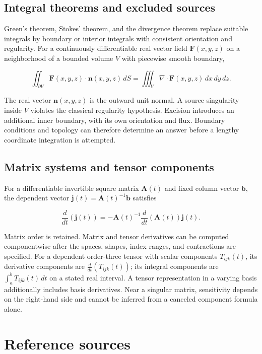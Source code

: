 \documentclass[11pt,oneside,openany]{book}
\begin{document}
\par\addvspace{8pt}\noindent\begin{minipage}{\linewidth}
\subsection{Integral theorems and excluded sources}

Green's theorem, Stokes' theorem, and the divergence theorem replace suitable
integrals by boundary or interior integrals with consistent orientation and
regularity. For a continuously differentiable real vector field \(\mathbf F(x,y,z)\)
on a neighborhood of a bounded volume \(V\) with piecewise smooth boundary,

\[
\iint_{\partial V}\mathbf F(x,y,z)\cdot\mathbf n(x,y,z)\,dS
=\iiint_V\nabla\cdot\mathbf F(x,y,z)\,dx\,dy\,dz.
\]

The real vector \(\mathbf n(x,y,z)\) is the outward unit normal. A source singularity
inside \(V\) violates the classical regularity hypothesis. Excision introduces an
additional inner boundary, with its own orientation and flux. Boundary
conditions and topology can therefore determine an answer before a lengthy
coordinate integration is attempted.

\end{minipage}\par
\par\addvspace{8pt}\noindent\begin{minipage}{\linewidth}
\subsection{Matrix systems and tensor components}

For a differentiable invertible square matrix \(\mathbf A(t)\) and fixed column
vector \(\mathbf b\), the dependent vector \(\mathbf j(t)=\mathbf A(t)^{-1}\mathbf b\)
satisfies

\[
\frac{d}{dt}\left(\mathbf j(t)\right)
=-\mathbf A(t)^{-1}\frac{d}{dt}\left(\mathbf A(t)\right)\mathbf j(t).
\]

Matrix order is retained. Matrix and tensor derivatives can be computed
componentwise after the spaces, shapes, index ranges, and contractions are
specified. For a dependent order-three tensor with scalar components
\(T_{ijk}(t)\), its derivative components are \(\frac{d}{dt}(T_{ijk}(t))\); its
integral components are \(\int_a^bT_{ijk}(t)\,dt\) on a stated real interval.
A tensor representation in a varying basis additionally includes basis derivatives.
Near a singular matrix, sensitivity depends on the right-hand side and cannot
be inferred from a canceled component formula alone.

\end{minipage}\par
{}\section{Reference sources}
\end{document}
